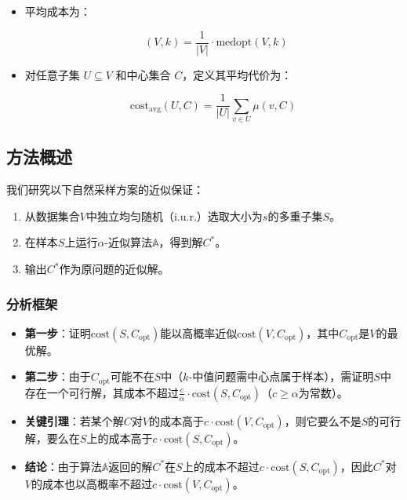 \documentclass[lang=cn,newtx,10pt,scheme=chinese,chinesefont=nofont,citestyle=gb7714-2015, bibstyle=gb7714-2015]{elegantbook}
\DeclareMathOperator{\medavg}{med_{avg}}
\begin{document}
\begin{refsection}
\begin{itemize}
\[
    \text{medopt}(V, k) = \min_{C \subseteq V, |C| = k} \sum_{v \in V} \mu(v, C)
  \]


  \item 平均成本为：
  

\[
    \medavg(V, k) = \frac{1}{|V|} \cdot \text{medopt}(V, k)
  \]


  \item 对任意子集 $U \subseteq V$ 和中心集合 $C$，定义其平均代价为：
  

\[
    \text{cost}_{\text{avg}}(U, C) = \frac{1}{|U|} \sum_{v \in U} \mu(v, C)
  \]


\end{itemize}

\subsection{方法概述}
我们研究以下自然采样方案的近似保证：
\begin{enumerate}[label=\textbf{步骤 \arabic*：},leftmargin=*]
    \item 从数据集合$V$中独立均匀随机（i.u.r.）选取大小为$s$的多重子集$S$。
    \item 在样本$S$上运行$\alpha$-近似算法$\mathbb{A}$，得到解$C^*$。
    \item 输出$C^*$作为原问题的近似解。
\end{enumerate}

\subsubsection{分析框架}
\begin{itemize}
    \item \textbf{第一步}：证明$\text{cost}(S, C_{\text{opt}})$能以高概率近似$\text{cost}(V, C_{\text{opt}})$，其中$C_{\text{opt}}$是$V$的最优解。
    \item \textbf{第二步}：由于$C_{\text{opt}}$可能不在$S$中（$k$-中值问题需中心点属于样本），需证明$S$中存在一个可行解，其成本不超过$\frac{c}{\alpha} \cdot \text{cost}(S, C_{\text{opt}})$（$c \geq \alpha$为常数）。
    \item \textbf{关键引理}：若某个解$C$对$V$的成本高于$c \cdot \text{cost}(V, C_{\text{opt}})$，则它要么不是$S$的可行解，要么在$S$上的成本高于$c \cdot \text{cost}(S, C_{\text{opt}})$。
    \item \textbf{结论}：由于算法$\mathbb{A}$返回的解$C^*$在$S$上的成本不超过$c \cdot \text{cost}(S, C_{\text{opt}})$，因此$C^*$对$V$的成本也以高概率不超过$c \cdot \text{cost}(V, C_{\text{opt}})$。
\end{itemize}




\end{refsection}
\end{document}
